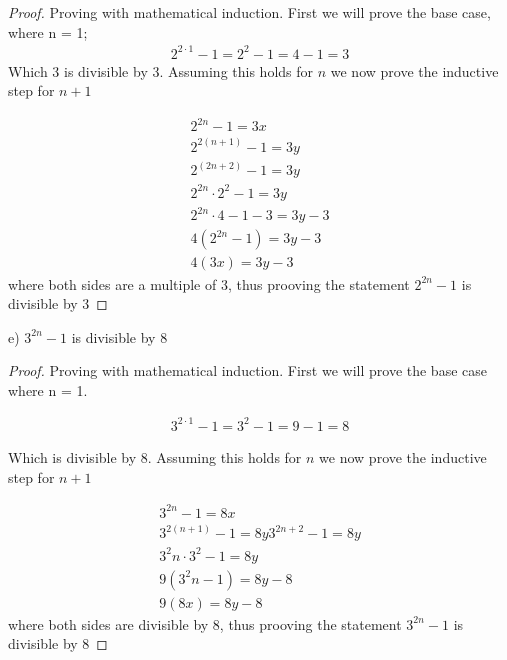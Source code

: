 \documentclass[]{report}
\begin{document}
\begin{proof}
	Proving with mathematical induction.
	First we will prove the base case, where n = 1;
	\begin{align*}
	2^{2\cdot 1} - 1 = 2^2 -1 = 4 -1 = 3
	\end{align*}
	Which 3 is divisible by 3. Assuming this holds for $n$ we now prove the inductive step for $n+1$
	
	\begin{align*}
		2^{2n}  - 1 = 3x \tag{our original statement with x being some unknown integer} \\
		2^{2(n+1)}  - 1 = 3y \tag{for n+1 with a new unknown y}\\
		2^{(2n+2)}  - 1 = 3y\\
		2^{2n} \cdot 2^2 -1 = 3y \tag{splitting the power into two components}\\
		2^{2n} \cdot 4 - 1 -3 = 3y - 3 \tag{taking 3 off both sides}\\
		4(2^{2n} - 1) = 3y - 3 \\
		4(3x) = 3y - 3 \tag{substituting the original statement in}
	\end{align*}
	where both sides are a multiple of 3, thus prooving the statement $2^{2n} - 1$ is divisible by 3
\end{proof}

e) $3^{2n} - 1$ is divisible by 8

\begin{proof}
	Proving with mathematical induction.
	First we will prove the base case where n = 1.
	
	\begin{align*}
		3^{2\cdot 1} - 1 = 3^2 - 1 = 9-1 = 8
	\end{align*}
	
	Which is divisible by 8. Assuming this holds for $n$ we now prove the inductive step for $n+1$
	
	\begin{align*}
		3^{2n} - 1 = 8x \tag{our original statement, with x being some unknown integer}\\
		3^{2(n+1)} - 1 = 8y \tag{for n+1 with a new unknown y}
		3^{2n + 2} - 1 = 8y\\
		3^2n \cdot 3^2 - 1 = 8y\\
		9(3^2n - 1) = 8y - 8 \tag{taking 8 from both sides}\\
		9(8x) = 8y - 8
	\end{align*}
	where both sides are divisible by 8, thus prooving the statement $3^{2n} - 1$ is divisible by 8
\end{proof}
\end{document}
